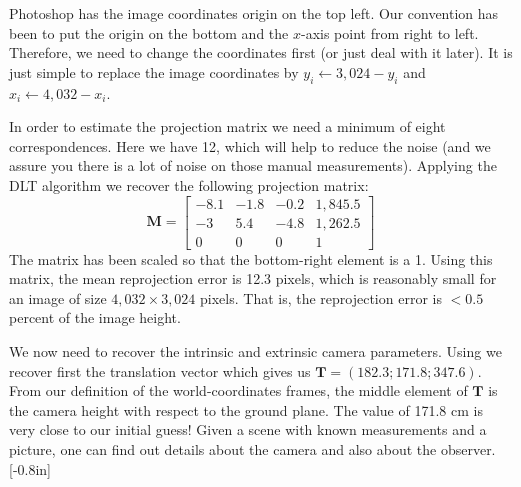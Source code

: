 Photoshop has the image coordinates origin on the top left. Our convention has been to put the origin on the bottom and the $x$-axis point from right to left. Therefore, we need to change the coordinates first (or just deal with it later). It is just simple to replace the image coordinates by $y_i \leftarrow 3{,}024-y_i$ and $x_i \leftarrow 4{,}032-x_i$.

In order to estimate the projection matrix we need a minimum of eight correspondences. Here we have 12, which will help to reduce the noise (and we assure you there is a lot of noise on those manual measurements). Applying the DLT algorithm we recover the following projection matrix:
\begin{equation}
    \mathbf{M} = 
    \begin{bmatrix}
    -8.1    &       -1.8      &     -0.2    &     1{,}845.5\\
      -3    &        5.4      &     -4.8    &     1{,}262.5\\
       0    &          0      &        0    &          1
    \end{bmatrix}
\end{equation}
The matrix has been scaled so that the bottom-right element is a 1. Using this matrix, the mean reprojection error is 12.3 pixels, which is reasonably small for an image of size $4{,}032 \times 3{,}024$ pixels. That is, the reprojection error is $<0.5$ percent of the image height. 

We now need to recover the intrinsic and extrinsic camera parameters.  Using \eqn{\ref{eq:recover_translation}} we recover first the translation vector which gives us $\mathbf{T} = (182.3; 171.8; 347.6)$. From our definition of the world-coordinates frames, the middle element of $\mathbf{T}$ is the camera height with respect to the ground plane. The value of 171.8 cm is very close to our initial guess! Given a scene with known measurements and a picture, one can find out details about the camera and also about the observer. [-0.8in]


